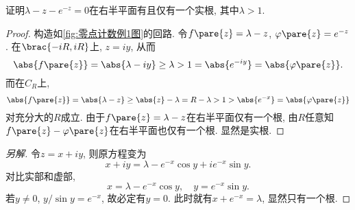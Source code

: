 \documentclass{ctexart}
\begin{document}
\begin{sample}
    \begin{ex}
        \label{ex:零点计数例1}
        证明$\lambda - z - e^{-z} = 0$在右半平面有且仅有一个实根, 其中$\lambda > 1$.
    \end{ex}
    \begin{proof}
        构造如\cref{fig:零点计数例1图}的回路. 令$f\pare{z} = \lambda - z$, $\varphi\pare{z} = e^{-z}$. 在$\brac{-iR,iR}$上, $z = iy$, 从而
        \[ \abs{f\pare{z}} = \abs{\lambda-iy} \ge \lambda > 1 = \abs{e^{-iy}} = \abs{\varphi\pare{z}}. \]
        而在$C_R$上,
        \[ \abs{f\pare{z}} = \abs{\lambda - z} \ge \abs{z} - \lambda = R-\lambda > 1 > \abs{e^{-x}} = \abs{\varphi\pare{z}} \]
        对充分大的$R$成立. 由于$f\pare{z} = \lambda - z$在右半平面仅有一个根, 由$R$任意知$f\pare{z} - \varphi\pare{z}$在右半平面也仅有一个根. 显然是实根.
    \end{proof}
    \begin{proof}[另解]
        令$z = x + iy$, 则原方程变为
        \[ x + iy = \lambda - e^{-x}\cos y + ie^{-x}\sin y. \]
        对比实部和虚部,
        \[ x = \lambda - e^{-x}\cos y,\quad y = e^{-x}\sin y. \]
        若$y\neq 0$, $y/\sin y = e^{-x}$, 故必定有$y = 0$. 此时就有$x + e^{-x} = \lambda$, 显然只有一个根.
    \end{proof}
\end{sample}


\end{document}
